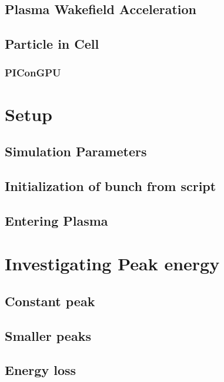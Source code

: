 \section{Plasma Wakefield Acceleration}
\section{Particle in Cell}
\subsection{PIConGPU}

\chapter{Setup}
\section{Simulation Parameters}
\section{Initialization of bunch from script}
\section{Entering Plasma}

\chapter{Investigating Peak energy}
\section{Constant peak}
\section{Smaller peaks}
\section{Energy loss}

\printbibliography[heading=bibintoc]

\confirmation

